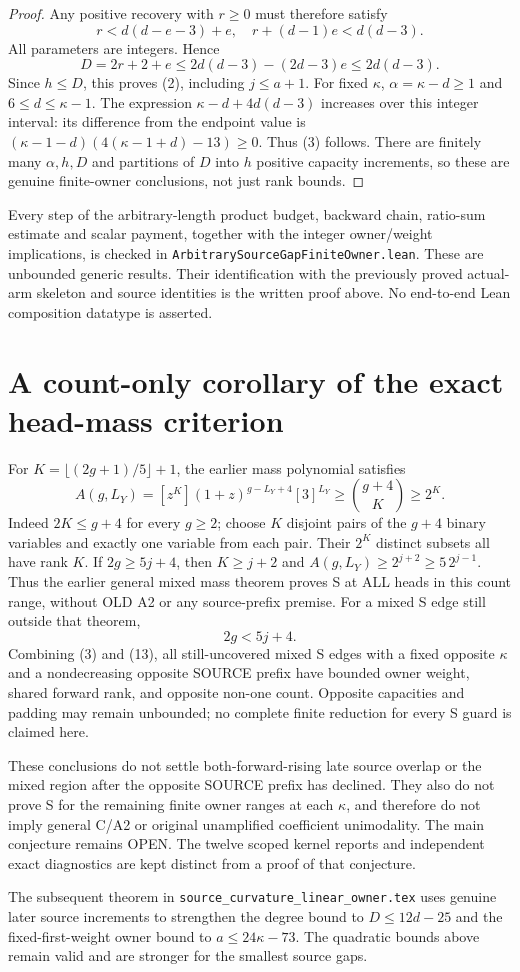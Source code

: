 \begin{proof}
Any positive recovery with $r\ge0$ must therefore satisfy
\[
 r<d(d-e-3)+e,
 \quad r+(d-1)e<d(d-3).
\]
All parameters are integers. Hence
\[
 D=2r+2+e\le2d(d-3)-(2d-3)e\le2d(d-3).             \tag{11}
\]
Since $h\le D$, this proves (2), including $j\le a+1$.
For fixed $\kappa$, $\alpha=\kappa-d\ge1$ and
$6\le d\le\kappa-1$. The expression
$\kappa-d+4d(d-3)$ increases over this integer interval:
its difference from the endpoint value is
$(\kappa-1-d)(4(\kappa-1+d)-13)\ge0$.
Thus (3) follows. There are finitely many $\alpha,h,D$ and
partitions of $D$ into $h$ positive capacity increments, so
these are genuine finite-owner conclusions, not just rank bounds.
\end{proof}

Every step of the arbitrary-length product budget, backward
chain, ratio-sum estimate and scalar payment, together with the
integer owner/weight implications, is checked in
\texttt{ArbitrarySourceGapFiniteOwner.lean}. These are unbounded
generic results. Their identification with the previously proved
actual-arm skeleton and source identities is the written proof
above. No end-to-end Lean composition datatype is asserted.

\section{A count-only corollary of the exact head-mass criterion}
For $K=\lfloor(2g+1)/5\rfloor+1$, the earlier mass polynomial satisfies
\[
 A(g,L_Y)=[z^K](1+z)^{g-L_Y+4}[3]^{L_Y}
           \ge {g+4\choose K}\ge2^K.                 \tag{12}
\]
Indeed $2K\le g+4$ for every $g\ge2$; choose $K$ disjoint
pairs of the $g+4$ binary variables and exactly one variable
from each pair. Their $2^K$ distinct subsets all have rank $K$.
If $2g\ge5j+4$, then $K\ge j+2$ and
$A(g,L_Y)\ge2^{j+2}\ge5\,2^{j-1}$.
Thus the earlier general mixed mass theorem proves S at ALL
heads in this count range, without OLD A2 or any source-prefix
premise. For a mixed S edge still outside that theorem,
\[
                               2g<5j+4.               \tag{13}
\]
Combining (3) and (13), all still-uncovered mixed S edges with
a fixed opposite $\kappa$ and a nondecreasing opposite SOURCE
prefix have bounded owner weight, shared forward rank, and
opposite non-one count. Opposite capacities and padding may
remain unbounded; no complete finite reduction for every S
guard is claimed here.

These conclusions do not settle both-forward-rising late source
overlap or the mixed region after the opposite SOURCE prefix
has declined. They also do not prove S for the remaining finite
owner ranges at each $\kappa$, and therefore do not imply general
C/A2 or original unamplified coefficient unimodality. The main
conjecture remains OPEN. The twelve scoped kernel reports and
independent exact diagnostics are kept distinct from a proof
of that conjecture.

The subsequent theorem in \texttt{source\_curvature\_linear\_owner.tex}
uses genuine later source increments to strengthen the degree bound
to $D\le12d-25$ and the fixed-first-weight owner bound to
$a\le24\kappa-73$. The quadratic bounds above remain valid and
are stronger for the smallest source gaps.
